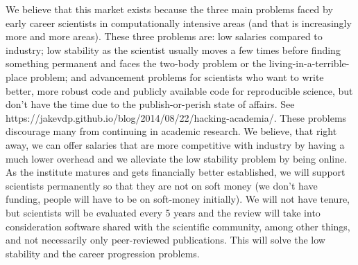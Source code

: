 We believe that this market exists because the three main problems faced by early career scientists in computationally intensive areas (and that is increasingly more and more areas). These three problems are: low salaries compared to industry; low stability as the scientist usually moves a few times before finding something permanent and faces the two-body problem or the living-in-a-terrible-place problem; and advancement problems for scientists who want to write better, more robust code and publicly available code for reproducible science, but don't have the time due to the publish-or-perish state of affairs. See https://jakevdp.github.io/blog/2014/08/22/hacking-academia/. These problems discourage many from continuing in academic research. We believe, that right away, we can offer salaries that are more competitive with industry by having a much lower overhead and we alleviate the low stability problem by being online. As the institute matures and gets financially better established, we will support scientists permanently so that they are not on soft money (we don't have funding, people will have to be on soft-money initially). We will not have tenure, but scientists will be evaluated every 5 years and the review will take into consideration software shared with the scientific community, among other things, and not necessarily only peer-reviewed publications. This will solve the low stability and the career progression problems.